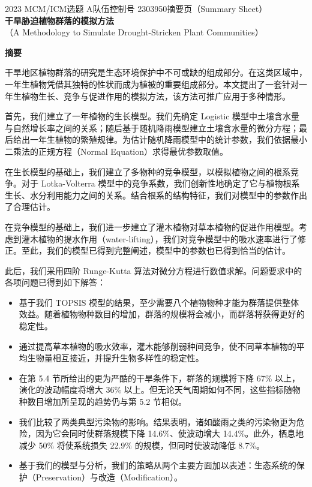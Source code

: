 \documentclass[11pt,a4paper]{ctexart}
\begin{document}
\thispagestyle{empty}
\begin{center}
{\small 2023 MCM/ICM\quad 选题 A\quad 队伍控制号 2303950\quad 摘要页（Summary Sheet）}\\[18pt]
{\LARGE\bfseries 干旱胁迫植物群落的模拟方法}\\[8pt]
{\large （A Methodology to Simulate Drought-Stricken Plant Communities）}\\[10pt]
\end{center}

\begin{center}
{\large\bfseries 摘\quad 要}
\end{center}

\vspace{6pt}
干旱地区植物群落的研究是生态环境保护中不可或缺的组成部分。在这类区域中，一年生植物凭借其独特的性状而成为植被的重要组成部分。本文提出了一套针对一年生植物生长、竞争与促进作用的模拟方法，该方法可推广应用于多种情形。

首先，我们建立了一年植物的生长模型。我们先确定 Logistic 模型中土壤含水量与自然增长率之间的关系；随后基于随机降雨模型建立土壤含水量的微分方程；最后给出一年生植物的繁殖规律。为估计随机降雨模型中的统计参数，我们依据最小二乘法的正规方程（Normal Equation）求得最优参数取值。

在生长模型的基础上，我们建立了多物种的竞争模型，以模拟植物之间的根系竞争。对于 Lotka-Volterra 模型中的竞争系数，我们创新性地确定了它与植物根系生长、水分利用能力之间的关系。结合根系的结构特征，我们对模型中的参数作出了合理估计。

在竞争模型的基础上，我们进一步建立了灌木植物对草本植物的促进作用模型。考虑到灌木植物的提水作用（water-lifting），我们对竞争模型中的吸水速率进行了修正。至此，我们的模型已得到完整阐述，模型中的参数也已得到恰当的估计。

此后，我们采用四阶 Runge-Kutta 算法对微分方程进行数值求解。问题要求中的各项问题已得到如下解答：

\begin{itemize}
\item 基于我们 TOPSIS 模型的结果，至少需要八个植物物种才能为群落提供整体效益。随着植物物种数目的增加，群落的规模将会减小，而群落将获得更好的稳定性。
\item 通过提高草本植物的吸水效率，灌木能够削弱种间竞争，使不同草本植物的平均生物量相互接近，并提升生物多样性的稳定性。
\item 在第 5.4 节所给出的更为严酷的干旱条件下，群落的规模将下降 67\% 以上，演化的波动幅度将增大 36\% 以上。但无论天气周期如何不同，这些指标随物种数目增加所呈现的趋势仍与第 5.2 节相似。
\item 我们比较了两类典型污染物的影响。结果表明，诸如酸雨之类的污染物更为危险，因为它会同时使群落规模下降 14.6\%、使波动增大 14.4\%。此外，栖息地减少 50\% 将使系统损失 22.9\% 的规模，但同时使波动降低 8.7\%。
\item 基于我们的模型与分析，我们的策略从两个主要方面加以表述：生态系统的保护（Preservation）与改造（Modification）。
\end{itemize}
\end{document}
